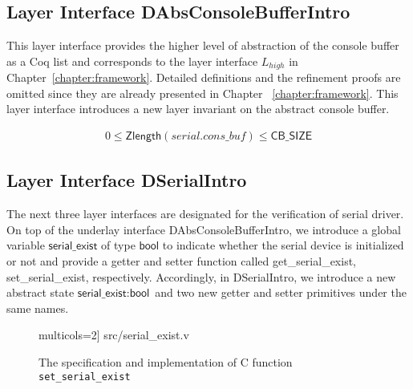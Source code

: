 \subsection{Layer Interface DAbsConsoleBufferIntro}

This layer interface provides the higher level of abstraction of the console
buffer as a Coq list and corresponds to the layer interface $L_{high}$ in
Chapter~\ref{chapter:framework}. Detailed definitions and the refinement
proofs are omitted since they are already presented in Chapter~
\ref{chapter:framework}. This layer interface introduces a new layer
invariant on the abstract console buffer.

\begin{invariant}
\begin{align*}
0 \leq \textsf{Zlength} (serial.cons\_buf) \leq \textsf{CB\_SIZE}
\end{align*}
\end{invariant}

\subsection{Layer Interface DSerialIntro}
\label{sec:dserialintro}

The next three layer interfaces are designated for the verification of serial
driver. On top of the underlay interface DAbsConsoleBufferIntro, we introduce a
global variable $\textsf{serial\_exist}$ of type $\textsf{bool}$ to indicate
whether the serial device is initialized or not and provide a getter and setter
function called \textsf{get\_serial\_exist}, \textsf{set\_serial\_exist},
respectively. Accordingly, in \textsf{DSerialIntro}, we introduce a new abstract
state $\textsf{serial\_exist}: \textsf{bool}$ and two new getter and setter
primitives under the same names.



\begin{figure}
	 multicols=2] {src/serial_exist.v}
	\caption{The specification and implementation of C function \texttt{set\_serial\_exist}}
	\label{fig:serial-exist}
\end{figure}

